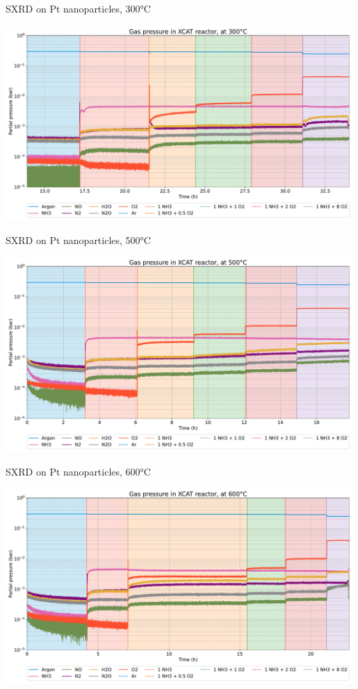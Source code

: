 \begin{frame}{SXRD on Pt nanoparticles, 300°C}

	\includegraphics[width=0.99\textwidth]{Figures/gas_analysis/SXRD/Nanoparticles/rga_300_norm_ptot.pdf}

\end{frame}

\begin{frame}{SXRD on Pt nanoparticles, 500°C}

	\includegraphics[width=0.99\textwidth]{Figures/gas_analysis/SXRD/Nanoparticles/rga_500_norm_ptot.pdf}

\end{frame}

\begin{frame}{SXRD on Pt nanoparticles, 600°C}

	\includegraphics[width=0.99\textwidth]{Figures/gas_analysis/SXRD/Nanoparticles/rga_600_norm_ptot.pdf}

\end{frame}

